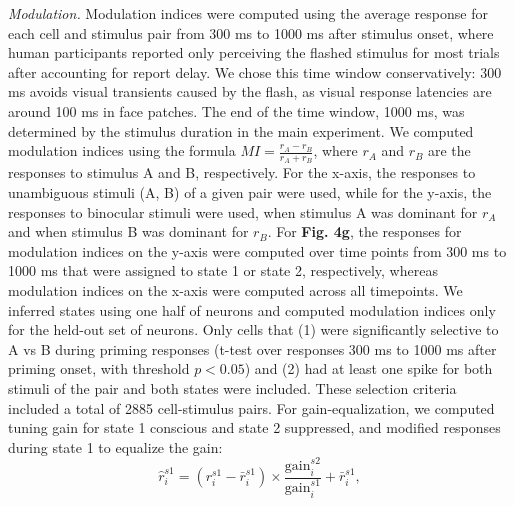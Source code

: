 \documentclass{article}
\begin{document}
\textit{Modulation.} Modulation indices were computed using the average response for each cell and stimulus pair from 300 ms to 1000 ms after stimulus onset, where human participants reported only perceiving the flashed stimulus for most trials after accounting for report delay. We chose this time window conservatively: 300 ms avoids visual transients caused by the flash, as visual response latencies are around 100 ms in face patches. The end of the time window, 1000 ms, was determined by the stimulus duration in the main experiment. We computed modulation indices using the formula $MI = \frac{r_A - r_B}{r_A + r_B}$, where $r_A$ and $r_B$ are the responses to stimulus A and B, respectively. For the x-axis, the responses to unambiguous stimuli (A, B) of a given pair were used, while for the y-axis, the responses to binocular stimuli were used, when stimulus A was dominant for $r_A$ and when stimulus B was dominant for $r_B$. For \textbf{Fig. 4g}, the responses for modulation indices on the y-axis were computed over time points from 300 ms to 1000 ms that were assigned to state 1 or state 2, respectively, whereas modulation indices on the x-axis were computed across all timepoints. We inferred states using one half of neurons and computed modulation indices only for the held-out set of neurons. Only cells that (1) were significantly selective to A vs B during priming responses (t-test over responses 300 ms to 1000 ms after priming onset, with threshold $p < 0.05$) and (2) had at least one spike for both stimuli of the pair and both states were included. These selection criteria included a total of 2885 cell-stimulus pairs. For gain-equalization, we computed tuning gain for state 1 conscious and state 2 suppressed, and modified responses during state 1 to equalize the gain:
\begin{equation*}
\hat{r}^{s1}_i = \left(r^{s1}_i - \bar{r}^{s1}_i\right) \times \frac{\mathrm{gain}^{s2}_i}{\mathrm{gain}^{s1}_i} + \bar{r}^{s1}_i ,
\end{equation*}
\end{document}
